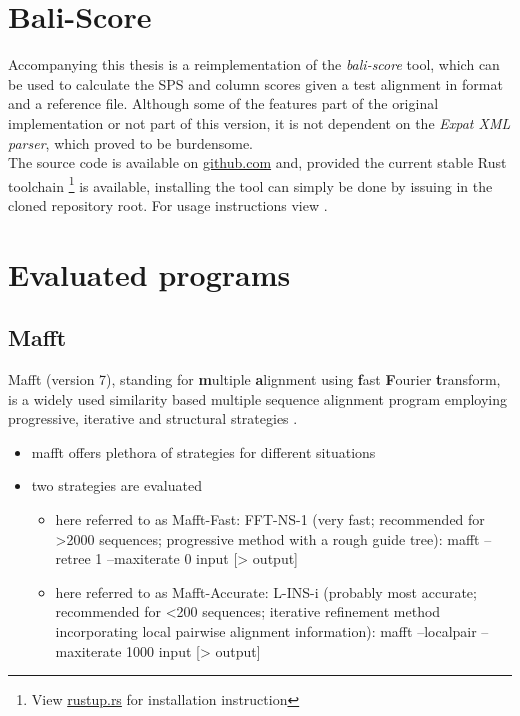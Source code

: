 \section{Bali-Score}
Accompanying this thesis is a reimplementation of the \textit{bali-score} tool, which can be used to calculate the SPS and column scores given a test alignment in  format and a \bb reference  file. Although some of the features part of the original implementation or not part of this version, it is not dependent on the \textit{Expat XML parser}, which proved to be burdensome.\\
The source code is available on \href{TODO github url}{github.com} and, provided the current stable Rust toolchain \footnote{View \href{https://rustup.rs}{rustup.rs} for installation instruction} is available, installing the tool can simply be done by issuing  in the cloned repository root. For usage instructions view .



\section{Evaluated programs}


\subsection{Mafft}
Mafft (version 7), standing for \textbf{m}ultiple \textbf{a}lignment using \textbf{f}ast \textbf{F}ourier \textbf{t}ransform, is a widely used similarity based multiple sequence alignment program employing progressive, iterative and structural strategies \cite{katoh2013mafft}.



\begin{itemize}
	\item mafft offers plethora of strategies for different situations
	\item two strategies are evaluated
	\begin{itemize}
		\item here referred to as Mafft-Fast: FFT-NS-1 (very fast; recommended for >2000 sequences; progressive method with a rough guide tree): mafft --retree 1 --maxiterate 0 input [> output]
		\item here referred to as Mafft-Accurate: L-INS-i (probably most accurate; recommended for <200 sequences; iterative refinement method incorporating local pairwise alignment information): mafft --localpair --maxiterate 1000 input [> output]
	\end{itemize}
\end{itemize}

